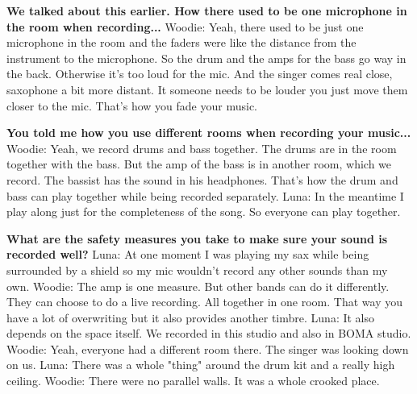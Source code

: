 \textbf{We talked about this earlier. How there used to be one microphone in the room when recording...}
\newline Woodie: Yeah, there used to be just one microphone in the room and the faders were like the distance from the instrument to the microphone.
So the drum and the amps for the bass go way in the back. Otherwise it's too loud for the mic. And the singer comes real close, saxophone a bit more distant.
It someone needs to be louder you just move them closer to the mic. That's how you fade your music.

\textbf{You told me how you use different rooms when recording your music...}
\newline Woodie: Yeah, we record drums and bass together. The drums are in the room together with the bass.
But the amp of the bass is in another room, which we record. The bassist has the sound in his headphones. That's how the drum and bass can play together while being recorded separately.
\newline Luna: In the meantime I play along just for the completeness of the song. So everyone can play together.

\textbf{What are the safety measures you take to make sure your sound is recorded well?}
\newline Luna: At one moment I was playing my sax while being surrounded by a shield so my mic wouldn't record any other sounds than my own.
\newline Woodie: The amp is one measure. But other bands can do it differently. They can choose to do a live recording. All together in one room.
That way you have a lot of overwriting but it also provides another timbre.
\newline Luna: It also depends on the space itself. We recorded in this studio and also in BOMA studio.
\newline Woodie: Yeah, everyone had a different room there. The singer was looking down on us.
\newline Luna: There was a whole "thing" around the drum kit and a really high ceiling.
\newline Woodie: There were no parallel walls. It was a whole crooked place.

